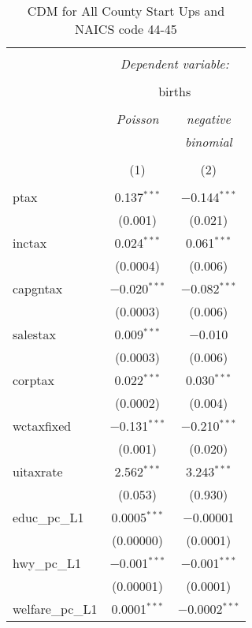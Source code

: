 
\begin{table}[!htbp] \centering 
  \caption{CDM for All County Start Ups and NAICS code 44-45} 
  \label{} 
\begin{tabular}{@{\extracolsep{5pt}}lcc} 
\\[-1.8ex]\hline 
\hline \\[-1.8ex] 
 & \multicolumn{2}{c}{\textit{Dependent variable:}} \\ 
\cline{2-3} 
\\[-1.8ex] & \multicolumn{2}{c}{births} \\ 
\\[-1.8ex] & \textit{Poisson} & \textit{negative} \\ 
 & \textit{} & \textit{binomial} \\ 
\\[-1.8ex] & (1) & (2)\\ 
\hline \\[-1.8ex] 
 ptax & 0.137$^{***}$ & $-$0.144$^{***}$ \\ 
  & (0.001) & (0.021) \\ 
  inctax & 0.024$^{***}$ & 0.061$^{***}$ \\ 
  & (0.0004) & (0.006) \\ 
  capgntax & $-$0.020$^{***}$ & $-$0.082$^{***}$ \\ 
  & (0.0003) & (0.006) \\ 
  salestax & 0.009$^{***}$ & $-$0.010 \\ 
  & (0.0003) & (0.006) \\ 
  corptax & 0.022$^{***}$ & 0.030$^{***}$ \\ 
  & (0.0002) & (0.004) \\ 
  wctaxfixed & $-$0.131$^{***}$ & $-$0.210$^{***}$ \\ 
  & (0.001) & (0.020) \\ 
  uitaxrate & 2.562$^{***}$ & 3.243$^{***}$ \\ 
  & (0.053) & (0.930) \\ 
  educ\_pc\_L1 & 0.0005$^{***}$ & $-$0.00001 \\ 
  & (0.00000) & (0.0001) \\ 
  hwy\_pc\_L1 & $-$0.001$^{***}$ & $-$0.001$^{***}$ \\ 
  & (0.00001) & (0.0001) \\ 
  welfare\_pc\_L1 & 0.0001$^{***}$ & $-$0.0002$^{***}$ \\ 

\end{tabular}
\end{table}
